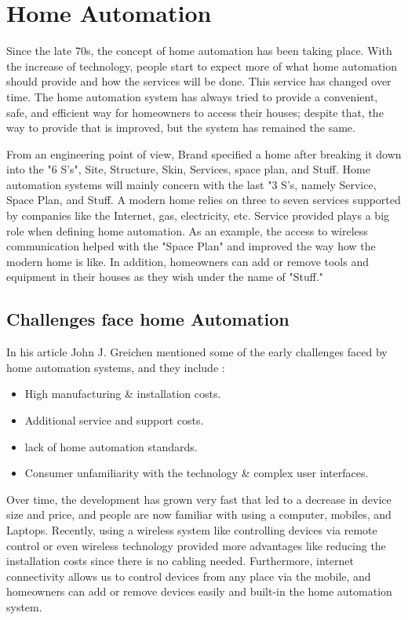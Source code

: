 \documentclass[conference]{IEEEtran}
\begin{document}
\section{Home Automation}

Since the late 70s, the concept of home automation has been taking place. With the increase of technology, people start to expect more of what home automation should provide and how the services will be done. This service has changed over time. The home automation system has always tried to provide a convenient, safe, and efficient way for homeowners to access their houses; despite that, the way to provide that is improved, but the system has remained the same.  


From an engineering point of view, Brand\cite{brand} specified a home after breaking it down into the "6 S's", Site, Structure, Skin, Services, space plan, and Stuff. Home automation systems will mainly concern with the last "3 S's, namely Service, Space Plan, and Stuff. A  modern home relies on three to seven services supported by companies like the Internet, gas, electricity, etc. Service provided plays a big role when defining home automation. As an example, the access to wireless communication helped with the "Space Plan" and improved the way how the modern home is like. In addition, homeowners can add or remove tools and equipment in their houses as they wish under the name of "Stuff."

\subsection{Challenges face home Automation }

 In his article \cite{Greichen}John J. Greichen  mentioned some of the early challenges faced by home automation systems, and they include : 
 
 
 \begin{itemize}
 	\item High manufacturing \& installation costs.
 \item Additional service and support costs.
 \item lack of home automation standards.
 \item Consumer unfamiliarity with the technology \& complex user interfaces. 
 	
 \end{itemize}

Over time, the development has grown very fast that led to a decrease in device size and price, and people are now familiar with using a computer, mobiles, and Laptops. Recently, using a wireless system like controlling devices via remote control or even wireless technology provided more advantages like reducing the installation costs since there is no cabling needed. Furthermore, internet connectivity allows us to control devices from any place via the mobile, and homeowners can add or remove devices easily and built-in the home automation system. 
\end{document}
